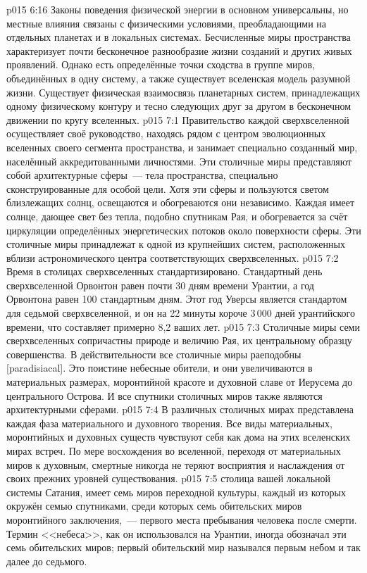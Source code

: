 \vs p015 6:16 Законы поведения физической энергии в основном универсальны, но местные влияния связаны с физическими условиями, преобладающими на отдельных планетах и в локальных системах. Бесчисленные миры пространства характеризует почти бесконечное разнообразие жизни созданий и других живых проявлений. Однако есть определённые точки сходства в группе миров, объединённых в одну систему, а также существует вселенская модель разумной жизни. Существует физическая взаимосвязь планетарных систем, принадлежащих одному физическому контуру и тесно следующих друг за другом в бесконечном движении по кругу вселенных.
\vs p015 7:1 Правительство каждой сверхвселенной осуществляет своё руководство, находясь рядом с центром эволюционных вселенных своего сегмента пространства, и занимает специально созданный мир, населённый аккредитованными личностями. Эти столичные миры представляют собой архитектурные сферы~--- тела пространства, специально сконструированные для особой цели. Хотя эти сферы и пользуются светом близлежащих солнц, освещаются и обогреваются они независимо. Каждая имеет солнце, дающее свет без тепла, подобно спутникам Рая, и обогревается за счёт циркуляции определённых энергетических потоков около поверхности сферы. Эти столичные миры принадлежат к одной из крупнейших систем, расположенных вблизи астрономического центра соответствующих сверхвселенных.
\vs p015 7:2 \pc Время в столицах сверхвселенных стандартизировано. Стандартный день сверхвселенной Орвонтон равен почти 30 дням времени Урантии, а год Орвонтона равен 100 стандартным дням. Этот год Уверсы является стандартом для седьмой сверхвселенной, и он на 22 минуты короче 3\,000 дней урантийского времени, что составляет примерно 8,2 ваших лет.
\vs p015 7:3 \pc Столичные миры семи сверхвселенных сопричастны природе и величию Рая, их центральному образцу совершенства. В действительности все столичные миры раеподобны [paradisiacal]. Это поистине небесные обители, и они увеличиваются в материальных размерах, моронтийной красоте и духовной славе от Иерусема до центрального Острова. И все спутники столичных миров также являются архитектурными сферами.
\vs p015 7:4 В различных столичных мирах представлена каждая фаза материального и духовного творения. Все виды материальных, моронтийных и духовных существ чувствуют себя как дома на этих вселенских мирах встреч. По мере восхождения во вселенной, переходя от материальных миров к духовным, смертные никогда не теряют восприятия и наслаждения от своих прежних уровней существования.
\vs p015 7:5 \pc {} столица вашей локальной системы Сатания, имеет семь миров переходной культуры, каждый из которых окружён семью спутниками, среди которых семь обительских миров моронтийного заключения,~--- первого места пребывания человека после смерти. Термин <<небеса>>, как он использовался на Урантии, иногда обозначал эти семь обительских миров; первый обительский мир назывался первым небом и так далее до седьмого.
